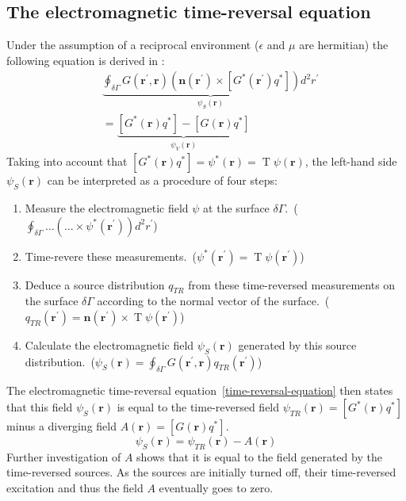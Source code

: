 \subsection{The electromagnetic time-reversal equation}
Under the assumption of a reciprocal environment (\(\epsilon \) and \(\mu \) are hermitian) the following equation is derived in \parencite{de_rosny_theory_2010}:
\begin{equation}\label{time-reversal-equation}
    \begin{aligned}
    & \underbrace{\oint_{\delta \Gamma} G(\mathbf{r}^{\prime}, \mathbf{r})\left(\mathbf{n}\left(\mathbf{r}^{\prime}\right) \times\left[G^*\left(\mathbf{r}^{\prime}\right) q^*\right]\right) d^2 r^{\prime}}_{\psi_S(\mathbf{r})} \\
    &=\underbrace{[G^*(\mathbf{r}) q^*] - [G(\mathbf{r}) q^*]}_{\psi_V(\mathbf{r})}
    \end{aligned}
\end{equation}
Taking into account that \([G^*(\mathbf{r}) q^*] = \psi^*(\mathbf{r}) = \operatorname{T}\psi(\mathbf{r})\), the left-hand side \(\psi_S(\mathbf{r})\) can be interpreted as a procedure of four steps:
\begin{enumerate}
    \item Measure the electromagnetic field \(\psi \) at the surface \(\delta \Gamma \).\ (\(\oint_{\delta \Gamma} \ldots  (\ldots \times \psi^*(\mathbf{r}^{\prime})) d^2 r^{\prime}\))
    \item Time-revere these measurements.\ (\(\psi^*(\mathbf{r}^{\prime}) = \operatorname{T}\psi(\mathbf{r}^{\prime})\))
    \item Deduce a source distribution \(q_{TR}\) from these time-reversed measurements on the surface \(\delta \Gamma \) according to the normal vector of the surface.\ (\(q_{TR}(\mathbf{r}^{\prime}) = \mathbf{n}(\mathbf{r}^{\prime}) \times \operatorname{T}\psi(\mathbf{r}^{\prime})\))
    \item Calculate the electromagnetic field \(\psi_S(\mathbf{r})\) generated by this source distribution.\ (\(\psi_S(\mathbf{r}) = \oint_{\delta \Gamma} G(\mathbf{r}^{\prime}, \mathbf{r}) q_{TR}(\mathbf{r}^{\prime})\))
\end{enumerate}
The electromagnetic time-reversal equation~\eqref{time-reversal-equation} then states that this field \(\psi_S(\mathbf{r})\) is equal to the time-reversed field \(\psi_{TR}(\mathbf{r}) = [G^*(\mathbf{r}) q^*]\) minus a diverging field \(A(\mathbf{r}) = [G(\mathbf{r}) q^*]\).
\begin{equation}
    \psi_S(\mathbf{r}) = \psi_{TR}(\mathbf{r}) - A(\mathbf{r})
\end{equation}
Further investigation of \(A\) shows that it is equal to the field generated by the time-reversed sources.
As the sources are initially turned off, their time-reversed excitation and thus the field \(A\) eventually goes to zero.

